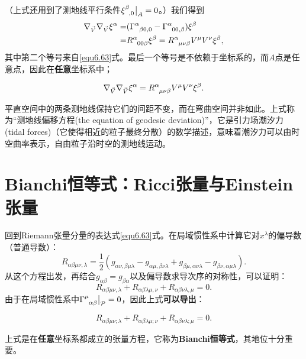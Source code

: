（上式还用到了测地线平行条件$\xi\indices{^\beta_{, 0}} \big|_{A} = 0$。）我们得到
\begin{align}
    \nabla_{\vec{V}} \nabla_{\vec{V}}  \xi^\alpha =& (\Gamma\indices{^\alpha_{\beta 0, 0}} - \Gamma\indices{^\alpha_{00, \beta}}) \xi^\beta \notag \\
    =& R\indices{^\alpha_{00 \beta}} \xi^\beta = R\indices{^\alpha_{\mu \nu \beta}} V^\mu V^\nu \xi^\beta, \label{equ6.86}
\end{align}
其中第二个等号来自\eqref{equ6.63}式。最后一个等号是不依赖于坐标系的，而$A$点是任意点，因此在\textbf{任意}坐标系中；
\begin{shaded}
\begin{equation}
    \nabla_{\vec{V}} \nabla_{\vec{V}} \xi^\alpha = R\indices{^\alpha_{\mu \nu \beta}} V^\mu V^\nu \xi^\beta.
\label{equ6.87}
\end{equation}
\end{shaded}
平直空间中的两条测地线保持它们的间距不变，而在弯曲空间并非如此。上式称为“测地线偏移方程(the equation of geodesic deviation)”，它是引力场潮汐力(tidal forces)（它使得相近的粒子最终分散）的数学描述，意味着潮汐力可以由时空曲率表示，自由粒子沿时空的测地线运动。



\section{Bianchi恒等式：Ricci张量与Einstein张量}
\label{sec6.6}
回到Riemann张量分量的表达式\eqref{equ6.63}式。在局域惯性系中计算它对$x^\lambda$的偏导数（普通导数）：
\begin{equation}
    R_{\alpha \beta \mu \nu, \lambda} = \frac{1}{2} (g_{\alpha \nu, \beta \mu \lambda} - g_{\alpha \mu, \beta \nu \lambda} + g_{\beta \mu, \alpha \nu \lambda} - g_{\beta \nu, \alpha \mu \lambda}).
\label{equ6.88}
\end{equation}
从这个方程出发，再结合$g_{\alpha \beta} = g_{\beta \alpha}$以及偏导数求导次序的对称性，可以证明：
\begin{equation}
    R_{\alpha \beta \mu \nu, \lambda} + R_{\alpha \beta \lambda \mu, \nu} + R_{\alpha \beta \nu \lambda, \mu} = 0.
\label{equ6.89}
\end{equation}
由于在局域惯性系中$\Gamma\indices{^\mu_{\alpha \beta}} \big|_{\MP} = 0$，因此上式\textbf{可以导出}：
\begin{shaded}
\begin{equation}
    R_{\alpha \beta \mu \nu; \lambda} + R_{\alpha \beta \lambda \mu; \nu} + R_{\alpha \beta \nu \lambda; \mu} = 0.
\label{equ6.90}
\end{equation}
\end{shaded}
上式是在\textbf{任意}坐标系都成立的张量方程，它称为\textbf{Bianchi恒等式}，其地位十分重要。

